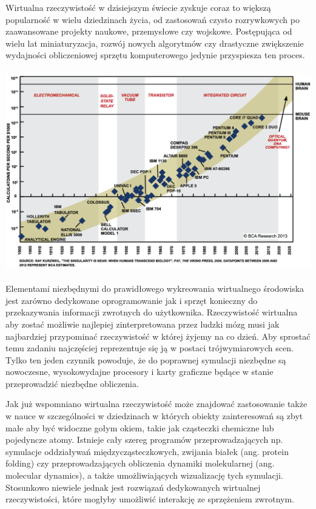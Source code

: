 \documentclass[licencjacka]{pracamgr}
\begin{document}
Wirtualna rzeczywistość w dzisiejszym świecie zyskuje coraz to większą popularność w wielu dziedzinach życia, od zastosowań czysto rozrywkowych po zaawansowane projekty naukowe, przemysłowe czy wojskowe. Postępująca od wielu lat miniaturyzacja, rozwój nowych algorytmów czy drastyczne zwiększenie wydajności obliczeniowej sprzętu komputerowego jedynie przyspiesza ten proces. 
\\
\\
\includegraphics[scale=0.35,center]{MooresLaw}
\\
\\
Elementami niezbędnymi do prawidłowego wykreowania wirtualnego środowiska jest zarówno dedykowane oprogramowanie jak i sprzęt konieczny do przekazywania informacji zwrotnych do użytkownika. Rzeczywistość wirtualna aby zostać możliwie najlepiej zinterpretowana przez ludzki mózg musi jak najbardziej przypominać rzeczywistość w której żyjemy na co dzień. Aby sprostać temu zadaniu najczęściej reprezentuje się ją w postaci trójwymiarowych scen. Tylko ten jeden czynnik powoduje, że do poprawnej symulacji niezbędne są nowoczesne, wysokowydajne procesory i karty graficzne będące w stanie przeprowadzić niezbędne obliczenia.

Jak już wspomniano wirtualna rzeczywistość może znajdować zastosowanie także w nauce w szczególności w dziedzinach w których obiekty zainteresowań są zbyt małe aby być widoczne gołym okiem, takie jak cząsteczki chemiczne lub pojedyncze atomy. Istnieje cały szereg programów przeprowadzających np. symulacje oddziaływań międzycząsteczkowych, zwijania białek (ang. protein folding) czy przeprowadzających obliczenia dynamiki molekularnej (ang. molecular dynamics), a także umożliwiających wizualizację tych symulacji. Stosunkowo niewiele jednak jest rozwiązań dedykowanych wirtualnej rzeczywistości, które mogłyby umożliwić interakcję ze sprzężeniem zwrotnym. 
	
\end{document}
